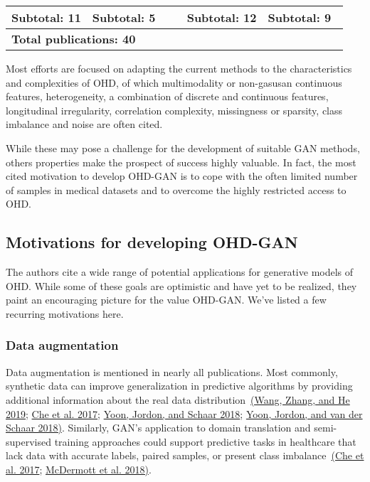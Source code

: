\documentclass[10pt]{article}
\begin{document}
\begin{table}
\begin{tabular}{@{}p{0.24\linewidth}p{0.24\linewidth}p{0.04\linewidth}p{0.24\linewidth}p{0.24\linewidth}@{}}
        \multicolumn{1}{l}{Subtotal: 11} & \multicolumn{1}{l}{Subtotal: 5} & {} & \multicolumn{1}{l}{Subtotal: 12} & \multicolumn{1}{l}{Subtotal: 9}\\ \midrule
        
        \multicolumn{5}{l}{\textbf{Total publications: 40}}\\
        \bottomrule
        \end{tabular}
\end{table}

Most efforts are focused on adapting the current methods to the
characteristics and complexities of OHD, of which multimodality or
non-gasusan continuous features, heterogeneity, a combination of
discrete and continuous features, longitudinal irregularity, correlation
complexity, missingness or sparsity, class imbalance and noise are often
cited.

While these may pose a challenge for the development of suitable GAN
methods, others properties make the prospect of success highly valuable.
In fact, the most cited motivation to develop OHD-GAN is to cope with
the often limited number of samples in medical datasets and to overcome
the highly restricted access to OHD.~

\subsection{Motivations for developing
OHD-GAN}

{\label{989356}}

The authors cite a wide range of potential applications for generative
models of OHD. While some of these goals are optimistic and have yet to
be realized, they paint an encouraging picture for the value OHD-GAN.
We've listed a few recurring motivations here.

\subsubsection{Data augmentation}

{\label{389127}}

Data augmentation is mentioned in nearly all publications. Most
commonly, synthetic data can improve generalization in predictive
algorithms by providing additional information about the real data
distribution~\hyperref[csl:9]{(Wang, Zhang, and He 2019}; \hyperref[csl:15]{Che et al. 2017}; \hyperref[csl:20]{Yoon, Jordon, and Schaar 2018}; \hyperref[csl:21]{Yoon, Jordon, and van der Schaar 2018)}. Similarly, GAN's application to domain
translation and semi-supervised training approaches could support
predictive tasks in healthcare that lack data with accurate labels,
paired samples, or present class imbalance~\hyperref[csl:15]{(Che et al. 2017}; \hyperref[csl:8]{McDermott et al. 2018)}.
\end{document}
